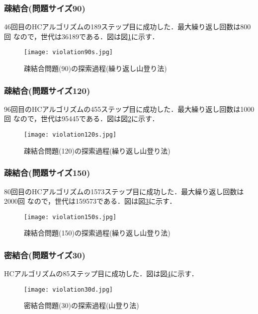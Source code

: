 \documentclass[a4j]{jarticle}
\begin{document}
\newpage
\subsubsection*{疎結合(問題サイズ90)}
46回目のHCアルゴリズムの189ステップ目に成功した．最大繰り返し回数は800回
なので，世代は36189である．図は図\ref{90s}に示す．
\begin{figure}[htb]
 \begin{center}
  \texttt{[image: violation90s.jpg]}
  \caption{疎結合問題(90)の探索過程(繰り返し山登り法)}
  \label{90s}
 \end{center}
\end{figure}

\subsubsection*{疎結合(問題サイズ120)}
96回目のHCアルゴリズムの455ステップ目に成功した．最大繰り返し回数は1000回
なので，世代は95445である．図は図\ref{120s}に示す．
\begin{figure}[htb]
 \begin{center}
  \texttt{[image: violation120s.jpg]}
  \caption{疎結合問題(120)の探索過程(繰り返し山登り法)}
  \label{120s}
 \end{center}
\end{figure}
\newpage
\subsubsection*{疎結合(問題サイズ150)}
80回目のHCアルゴリズムの1573ステップ目に成功した．最大繰り返し回数は2000回
なので，世代は159573である．図は図\ref{150s}に示す．

\begin{figure}[htb]
 \begin{center}
  \texttt{[image: violation150s.jpg]}
  \caption{疎結合問題(150)の探索過程(繰り返し山登り法)}
  \label{150s}
 \end{center}
\end{figure}

\subsubsection*{密結合(問題サイズ30)}
HCアルゴリズムの85ステップ目に成功した．図は図\ref{30d}に示す．
\begin{figure}[htb]
 \begin{center}
  \texttt{[image: violation30d.jpg]}
  \caption{密結合問題(30)の探索過程(山登り法)}
  \label{30d}
 \end{center}
\end{figure}
\newpage
\end{document}
